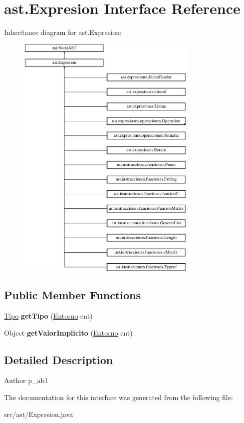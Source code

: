 \hypertarget{interfaceast_1_1_expresion}{}\section{ast.\+Expresion Interface Reference}
\label{interfaceast_1_1_expresion}
Inheritance diagram for ast.\+Expresion\+:\begin{figure}[H]
\begin{center}
\leavevmode
\includegraphics[height=12.000000cm]{interfaceast_1_1_expresion}
\end{center}
\end{figure}
\subsection*{Public Member Functions}
\begin{DoxyCompactItemize}
\item 
\mbox{\label{interfaceast_1_1_expresion_a514776885f5a1d95ce239ff1da48fe81}} 
\mbox{\hyperlink{classentorno_1_1_tipo}{Tipo}} {\bfseries get\+Tipo} (\mbox{\hyperlink{classentorno_1_1_entorno}{Entorno}} ent)
\item 
\mbox{\label{interfaceast_1_1_expresion_a098f8589cd4dc84f7d76b4958e2418f1}} 
Object {\bfseries get\+Valor\+Implicito} (\mbox{\hyperlink{classentorno_1_1_entorno}{Entorno}} ent)
\end{DoxyCompactItemize}


\subsection{Detailed Description}
\begin{DoxyAuthor}{Author}
p\+\_\+ab1 
\end{DoxyAuthor}


The documentation for this interface was generated from the following file\+:\begin{DoxyCompactItemize}
\item 
src/ast/Expresion.\+java\end{DoxyCompactItemize}
